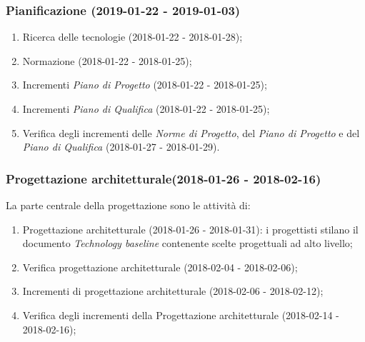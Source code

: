 \subsubsection{Pianificazione (2019-01-22 - 2019-01-03)\\} 
			\begin{enumerate}[label = 3.1.\arabic*)]
				\item Ricerca delle tecnologie (2018-01-22 - 2018-01-28);
				\item Normazione (2018-01-22 - 2018-01-25);
				\item Incrementi \textit{Piano di Progetto} (2018-01-22 - 2018-01-25);
				\item Incrementi \textit{Piano di Qualifica} (2018-01-22 - 2018-01-25);
				\item Verifica degli incrementi delle \textit{Norme di Progetto}, del \textit{Piano di Progetto} e del \textit{Piano di Qualifica} (2018-01-27 - 2018-01-29).
			\end{enumerate}
	
		\subsubsection{Progettazione architetturale(2018-01-26 - 2018-02-16)\\} La parte centrale della progettazione sono le attività di:
			\begin{enumerate}[label = 3.2.\arabic*)]
				\item Progettazione architetturale (2018-01-26 - 2018-01-31): i progettisti stilano il documento \textit{Technology baseline} contenente scelte progettuali ad alto livello;
				\item Verifica progettazione architetturale (2018-02-04 - 2018-02-06);
				\item Incrementi di progettazione architetturale (2018-02-06 - 2018-02-12);
				\item Verifica degli incrementi della Progettazione architetturale (2018-02-14 - 2018-02-16);
			\end{enumerate}

